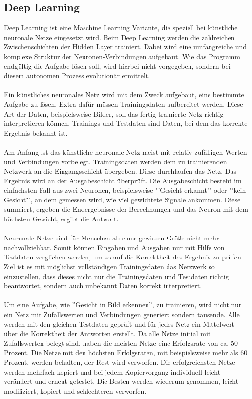 \documentclass[12pt,oneside,a4paper,parskip]{scrbook}
\begin{document}
\subsection{Deep Learning}
Deep Learning ist eine Maschine Learning Variante, die speziell bei künstliche neuronale Netze eingesetzt wird. Beim Deep Learning werden die zahlreichen Zwischenschichten der Hidden Layer trainiert. Dabei wird eine umfangreiche und komplexe Struktur der Neuronen-Verbindungen aufgebaut. Wie das Programm endgültig die Aufgabe lösen soll, wird hierbei nicht vorgegeben, sondern bei diesem autonomen Prozess evolutionär ermittelt.
\\\\
Ein künstliches neuronales Netz wird mit dem Zweck aufgebaut, eine bestimmte Aufgabe zu lösen. Extra dafür müssen Trainingsdaten aufbereitet werden. Diese Art der Daten, beispielsweise Bilder, soll das fertig trainierte Netz richtig interpretieren können. Trainings und Testdaten sind Daten, bei dem das korrekte Ergebnis bekannt ist.
\\\\
Am Anfang ist das künstliche neuronale Netz meist mit relativ zufälligen Werten und Verbindungen vorbelegt. Trainingsdaten werden dem zu trainierenden Netzwerk an die Eingangsschicht übergeben. Diese durchlaufen das Netz. Das Ergebnis wird an der Ausgabeschicht überprüft. Die Ausgabeschicht besteht im einfachsten Fall aus zwei Neuronen, beispielsweise "'Gesicht erkannt"' oder "'kein Gesicht"', an dem gemessen wird, wie viel gewichtete Signale ankommen. Diese summiert, ergeben die Endergebnisse der Berechnungen und das Neuron mit dem höchsten Gewicht, ergibt die Antwort.
\\\\
Neuronale Netze sind für Menschen ab einer gewissen Größe nicht mehr nachvollziehbar. Somit können Eingaben und Ausgaben nur mit Hilfe von Testdaten verglichen werden, um so auf die Korrektheit des Ergebnis zu prüfen.
Ziel ist es mit möglichst vollständigen Trainingsdaten das Netzwerk so einzustellen, dass dieses nicht nur die Trainingsdaten und Testdaten richtig beantwortet, sondern auch unbekannt Daten korrekt interpretiert.
\\\\
Um eine Aufgabe, wie ''Gesicht in Bild erkennen'', zu trainieren, wird nicht nur ein Netz mit Zufallswerten und Verbindungen generiert sondern tausende. Alle werden mit den gleichen Testdaten geprüft und für jedes Netz ein Mittelwert über die Korrektheit der Antworten erstellt. Da alle Netze initial mit Zufallswerten belegt sind, haben die meisten Netze eine Erfolgsrate von ca. 50 Prozent. Die Netze mit den höchsten Erfolgsraten, mit beispielsweise mehr als 60 Prozent, werden behalten, der Rest wird verworfen. Die erfolgreichsten Netze werden mehrfach kopiert und bei jedem Kopiervorgang individuell leicht verändert und erneut getestet. Die Besten werden wiederum genommen, leicht modifiziert, kopiert und schlechteren verworfen.
\end{document}

